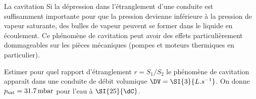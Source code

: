 \begin{exo}[PC][1][colle]{La cavitation}
Si la dépression dans l'étranglement d'une conduite est suffisamment importante pour que la pression devienne inférieure à la pression de vapeur saturante, des bulles de vapeur peuvent se former dans le liquide en écoulement. Ce phénomène de cavitation peut avoir des effets particulièrement dommageables sur les pièces mécaniques (pompes et moteurs thermiques en particulier).

Estimer pour quel rapport d'étranglement $r = S_1/S_2$ le phénomène de cavitation apparaît dans une conduite de débit volumique ${{\DV}} = \SI{3}{L.s^{-1}}$. On donne $p_{\rm sat} = \SI{31.7}{mbar}$ pour l'eau à $\SI{25}{\dC}$.
\end{exo}


